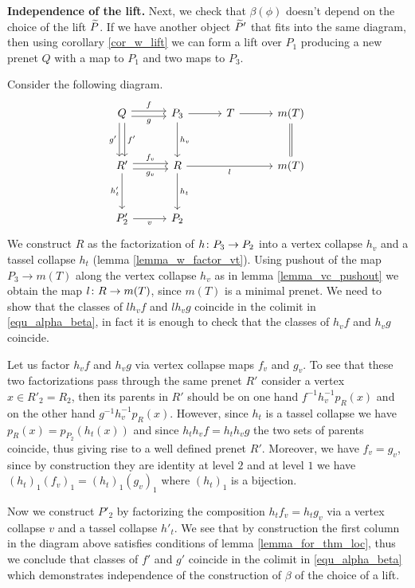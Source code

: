 \documentclass[letterpaper,12pt,leqno]{article}
\numberwithin{equation}{theorem}
\begin{document}
{\bf Independence of the lift.} Next, we check that $\beta(\phi)$ doesn't depend on the choice of the lift $\widetilde P$. If we have another object $\widetilde P'$ that
fits into the same diagram, then using corollary \ref{cor_w_lift} we can form a lift over $P_1$ producing a new prenet $Q$ with a map to $P_1$ and two maps to $P_3$.

Consider the following diagram.
$$
\begin{tikzcd}[sep=3em]
Q \ar[shift left, d, "f'"] \ar[shift right, d, "g'"'] \ar[shift left, r, "f"] \ar[shift right, r, "g"'] & P_3 \ar[d, "h_v"] \ar[r] & T \ar[r] & m(T) \ar[equal, d] \\
R'\ar[d, "h'_t"'] \ar[shift left, r, "f_v"] \ar[shift right, r, "g_v"'] & R \ar[d, "h_t"] \ar[rr, "l"'] && m(T) \\
P'_2 \ar[r, "v"'] & P_2 &&
\end{tikzcd}
$$
We construct $R$ as the factorization of $h\colon P_3 \to P_2$ into a vertex collapse $h_v$ and a tassel collapse $h_t$ (lemma \ref{lemma_w_factor_vt}). Using pushout
of the map $P_3 \to m(T)$ along the vertex collapse $h_v$ as in lemma \ref{lemma_vc_pushout} we obtain the map $l\colon R \to m(T)$, since $m(T)$ is a minimal prenet.
We need to show that the classes of $lh_v f$ and $lh_v g$ coincide in the colimit in \ref{equ_alpha_beta}, in fact it is enough to check that
the classes of $h_v f$ and $h_v g$ coincide.

Let us factor $h_v f$ and $h_v g$ via vertex collapse maps $f_v$ and $g_v$. To see that these two factorizations pass through the same prenet $R'$ consider a vertex
$x \in R'_2 = R_2$, then its parents in $R'$ should be on one hand $f^{-1} h_v^{-1} p_R(x)$ and on the other hand $g^{-1} h_v^{-1} p_R(x)$. However, since
$h_t$ is a tassel collapse we have $p_R(x) = p_{P_2}(h_t(x))$ and since $h_t h_v f = h_t h_v g$ the two sets of parents coincide, thus giving rise to a well defined
prenet $R'$. Moreover, we have $f_v = g_v$, since by construction they are identity at level $2$ and at level $1$ we have $(h_t)_1 (f_v)_1 = (h_t)_1 (g_v)_1$ where
$(h_t)_1$ is a bijection.

Now we construct $P'_2$ by factorizing the composition $h_t f_v = h_t g_v$ via a vertex collapse $v$ and a tassel collapse $h'_t$. We see that by construction
the first column in the diagram above satisfies conditions of lemma \ref{lemma_for_thm_loc}, thus we conclude that classes of $f'$ and $g'$ coincide in the colimit
in \ref{equ_alpha_beta} which demonstrates independence of the construction of $\beta$ of the choice of a lift.
\end{document}
